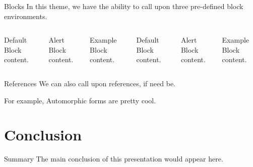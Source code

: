 \begin{frame}{Blocks}
  In this theme, we have the ability to call upon three pre-defined block environments.
  \begin{columns}[T,onlytextwidth]
      \begin{block}{Default}
        Block content.
      \end{block}

      \begin{alertblock}{Alert}
        Block content.
      \end{alertblock}

      \begin{exampleblock}{Example}
        Block content.
      \end{exampleblock}



      \begin{block}{Default}
        Block content.
      \end{block}

      \begin{alertblock}{Alert}
        Block content.
      \end{alertblock}

      \begin{exampleblock}{Example}
        Block content.
      \end{exampleblock}

  \end{columns}
\end{frame}

\begin{frame}{References}
  We can also call upon references, if need be. 
  
  For example, Automorphic forms are pretty cool. \cite{Bump96}
\end{frame}

\section{Conclusion}

\begin{frame}{Summary}
  The main conclusion of this presentation would appear here.
\end{frame}

